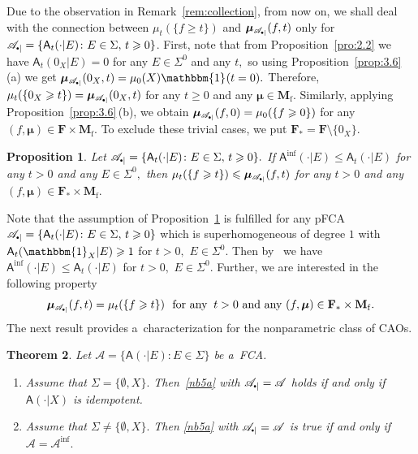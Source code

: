 \documentclass[preprint,11pt]{elsarticle}
\newtheorem{tw}{Theorem}[section]
\newtheorem{proposition}[tw]{Proposition}
\theoremstyle{definition}
\newcommand\bF{\mathbf{F}} %
\newcommand\bFa{\mathbf{F}_{\ast}} %
\newcommand\bMf{\mathbf{M}_{\mathrm{f}}}%
\newcommand\sA{\mathsf{A}}
\newcommand\aAi[3][E]{\sA^{#3}(#2|#1)}%
\newcommand\aAd[3][E]{\sA_{#3}(#2|#1)}%
\newcommand\sbullet[1][.5]{\mathbin{\vcenter{\hbox{\scalebox{#1}{$\bullet$}}}}}
\newcommand\bA{\mathscr{A}}%
\newcommand\bpA{\mathscr {A}_{\sbullet|}}%
\newcommand\bpeA{\mathscr {A}_{\sbullet|\sbullet}}%
\newcommand{\bmu}{\boldsymbol{\mu}}
\newcommand\bmub[1][\bpeA]{\bmu_{#1}}
\renewcommand\ge{\geqslant}
\renewcommand\le{\leqslant}
\newcommand{\mI}[1]{\mathbbm{1}_{#1}}%
\newcommand{\oh}{\color{brown}{}}
\newcommand{\mb}{\color{blue}{}}
\begin{document}
\medskip

Due to the observation in Remark~\ref{rem:collection}, from now on, we shall deal with the connection between $\mu_t(\{f\ge t\})$ and $ \bmu_{\bpA}(f,t)$ only for $\bpA=\{\sA_t(\cdot|E)\colon E\in \Sigma,\,t\ge 0\}$.
First, note that from Proposition~\ref{pro:2.2} we have $\sA_t(0_X|E)=0$ for any $E\in \Sigma^0$ and any $t,$ so using Proposition~\ref{prop:3.6}\,(a) we get
$\bmub[\bpA](0_X,t)=\mu_0(X)\mI{}(t=0).$ Therefore, $\mu_t(\{0_X\ge t\})=\bmub[\bpA](0_X,t)$ for any $t\ge 0$ and any $\bmu\in\bMf.$ Similarly, applying Proposition~\ref{prop:3.6}\,(b), we obtain $\bmub[\bpA](f,0)=\mu_0(\{f\ge 0\})$ for any $(f,\bmu)\in \bF\times \bMf.$ To exclude these trivial cases, we put $\bFa = \bF\setminus \{0_X\}.$


\begin{proposition}\label{pro:3.4}
Let $\bpA=\{\sA_t(\cdot|E)\colon E\in \Sigma,\,t\ge 0\}.$ If $\aAi{\cdot}{\inf}\le  \aAd{\cdot}{t}$  for any $t>0$ and any $E\in\Sigma^0,$ then $\mu_t(\{f\ge t\})\le \bmu_{\bpA}(f,t)$ for any $t>0$ and any $(f,\bmu)\in\bFa\times \bMf.$
\end{proposition}

Note that the assumption of Proposition~\ref{pro:3.4} is fulfilled for any pFCA $\bpA=\{\sA_t(\cdot|E)\colon E\in \Sigma,\,t\ge 0\}$ which is  superhomogeneous of degree $1$ with $\aAd{\mI{X}}{t}\ge 1$ for $t>0,$ $E\in \Sigma^0.$ Then by~\cite[Prop. 3.8\,(b)]{BHHK21} we have $\sA^{\inf}(\cdot|E)\le \sA_t(\cdot|E)$ for %
$t>0,$ $E\in \Sigma^0.$
Further, we are interested in the following property
\begin{equation}\label{nb5a}
 \bmu_{\bpA}(f,t)=\mu_t(\{f\ge t\})\,\, \text{ for any }\: t>0 \text{ and any }  (f,\bmu)\in \bFa\times \bMf.
\end{equation}
The next result provides a~characterization for the nonparametric class of CAOs.

\begin{tw}\label{tw:3.18}
Let $\bA=\{\sA(\cdot|E)\colon E\in \Sigma\}$ be a~FCA.
\begin{enumerate}[noitemsep]
    \item[(a)] Assume that    $\Sigma=\{\emptyset,X\}.$ Then~\eqref{nb5a} with $\bpA=\bA$ holds  if and only if  $\sA(\cdot|X)$ is idempotent.

    \item[(b)] Assume that  $\Sigma\neq \{\emptyset,X\}.$
    Then \eqref{nb5a} with $\bpA=\bA$
    is true  if and only if  $\bA=\bA^{\inf}.$
\end{enumerate}
\end{tw}
\end{document}
